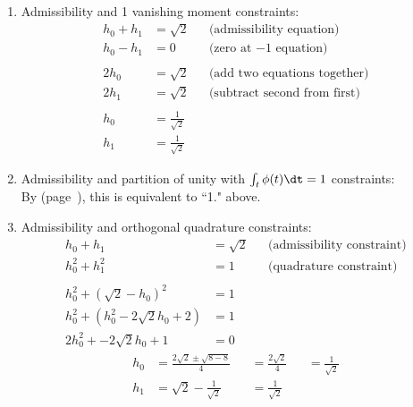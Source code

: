 \begin{enumerate}
\item Admissibility and 1 vanishing moment constraints:\\
\begin{align*}
  h_0 + h_1 &= \sqrt{2}    &&\text{(admissibility equation)} \\
  h_0 - h_1 &= 0           &&\text{(zero at $-1$ equation)}  \\
  \\
  2h_0 &= \sqrt{2}         &&\text{(add two equations together)}\\
  2h_1 &= \sqrt{2}         &&\text{(subtract second from first)} \\
  \\
  h_0 &= \frac{1}{\sqrt{2}} \\
  h_1 &= \frac{1}{\sqrt{2}} 
\end{align*}


\item Admissibility and partition of unity with $\int_t\phi(t)\dt=1$ constraints:\\
By  (page~\pageref{thm:zero_unity_evenodd}),
this is equivalent to ``1." above.

\item Admissibility and orthogonal quadrature constraints:
\begin{align*}
  h_0 + h_1 &= \sqrt{2}    &&\text{(admissibility constraint)} \\
  h_0^2 + h_1^2 &= 1       &&\text{(quadrature constraint)}  \\
  \\
  h_0^2 + (\sqrt{2}-h_0)^2        &= 1  \\
  h_0^2 + (h_0^2 -2\sqrt{2}h_0+2) &= 1  \\
  2h_0^2 + -2\sqrt{2}h_0+1        &= 0  
\end{align*}
\begin{align*}
  h_0 & = \frac{2\sqrt{2} \pm \sqrt{8-8}}{4}  
      &&= \frac{2\sqrt{2}}{4}  
      &&= \frac{1}{\sqrt{2}}  
      \\
  h_1 &= \sqrt{2} - \frac{1}{\sqrt{2}} 
      &&= \frac{1}{\sqrt{2}}  
\end{align*}

\end{enumerate}



